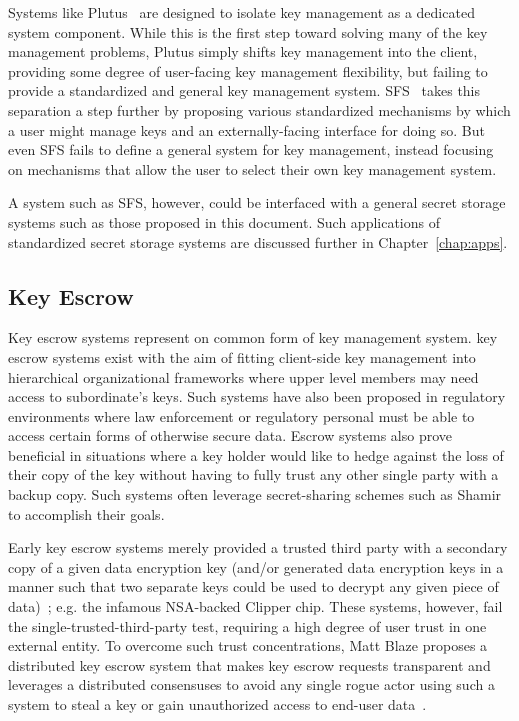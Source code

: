 Systems like Plutus~\cite{kallahalla2003} are designed to isolate key
management as a dedicated system component. While this is the first
step toward solving many of the key management problems, Plutus simply
shifts key management into the client, providing some degree of
user-facing key management flexibility, but failing to provide a
standardized and general key management
system. SFS~\cite{mazieres1999} takes this separation a step further
by proposing various standardized mechanisms by which a user might
manage keys and an externally-facing interface for doing so. But even
SFS fails to define a general system for key management, instead
focusing on mechanisms that allow the user to select their own key
management system.

A system such as SFS, however, could be interfaced with a general
secret storage systems such as those proposed in this document. Such
applications of standardized secret storage systems are discussed
further in Chapter~\ref{chap:apps}.

\subsection{Key Escrow}

Key escrow systems represent on common form of key management system.
key escrow systems exist with the aim of fitting client-side key
management into hierarchical organizational frameworks where upper
level members may need access to subordinate's keys. Such systems have
also been proposed in regulatory environments where law enforcement or
regulatory personal must be able to access certain forms of otherwise
secure data. Escrow systems also prove beneficial in situations where
a key holder would like to hedge against the loss of their copy of the
key without having to fully trust any other single party with a backup
copy. Such systems often leverage secret-sharing schemes such as
Shamir~\cite{shamir1979} to accomplish their goals.

Early key escrow systems merely provided a trusted third party with a
secondary copy of a given data encryption key (and/or generated data
encryption keys in a manner such that two separate keys could be used
to decrypt any given piece of data)~\cite{denning1996}; e.g. the
infamous NSA-backed Clipper chip. These systems, however, fail the
single-trusted-third-party test, requiring a high degree of user trust
in one external entity. To overcome such trust concentrations, Matt
Blaze proposes a distributed key escrow system that makes key escrow
requests transparent and leverages a distributed consensuses to avoid
any single rogue actor using such a system to steal a key or gain
unauthorized access to end-user data~\cite{blaze1996}.

